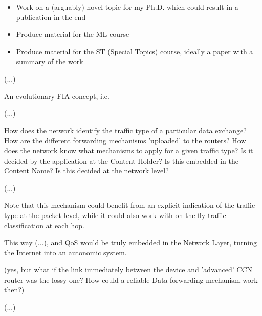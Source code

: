 \begin{itemize}

    \item Work on a (arguably) novel topic for my Ph.D. which could result in a 
            publication in the end
    \item Produce material for the ML course
    \item Produce material for the ST (Special Topics) course, ideally a paper 
            with a summary of the work

\end{itemize}

(...)

An evolutionary FIA concept, i.e.

(...)

How does the network identify the traffic type of a particular data exchange? 
How are the different forwarding mechanisms 'uploaded' to the routers? 
How does the network know what mechanisms to apply for a given traffic type? Is 
it decided by the application at the Content Holder? Is this embedded in the 
Content Name? Is this decided at the network level?

(...)

Note that this mechanism could benefit from an explicit indication of the 
traffic type at the packet level, while it could also work with on-the-fly 
traffic classification at each hop.

This way (...), and QoS would be truly embedded in the Network Layer, turning 
the Internet into an autonomic system.

(yes, but what if the link immediately between the device and 'advanced' CCN 
router was the lossy one? How could a reliable Data forwarding mechanism work 
then?)

(...)

